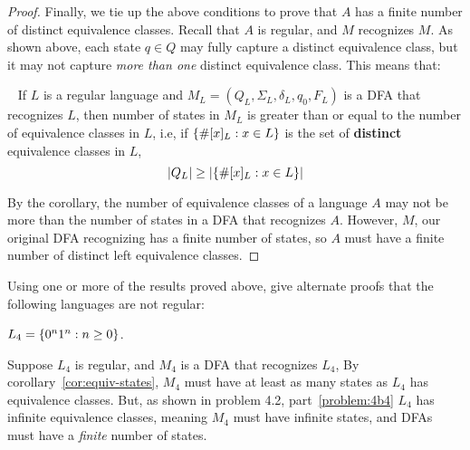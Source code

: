 \begin{problem}
\begin{enumalph}
\begin{Answer}
\begin{claim}
\begin{proof}
            \step
            Finally, we tie up the above conditions to prove that $A$ has a finite number of
            distinct equivalence classes. Recall that $A$ is regular, and $M$ recognizes $M$.
            As shown above, each state $q \in Q$ may fully capture a distinct equivalence class,
            but it may not capture \emph{more than one} distinct equivalence class.
            This means that:
            
            \begin{corollary}~\label{cor:equiv-states}
              If $L$ is a regular language and $M_L = (Q_L, \Sigma_L, \delta_L, q_0, F_L)$
              is a DFA that recognizes $L$, then number of states in $M_L$
              is greater than or equal to the number of equivalence classes in $L$, i.e,
              if $\left\{\#[x]_L : x \in L\right\}$ is the set of \textbf{distinct} equivalence classes in $L$,
              \[ \lvert Q_L\rvert \ge \lvert\left\{\#[x]_L : x \in L\right\}\rvert \]
            \end{corollary}
            
            \step
            By the corollary, the number of equivalence classes of a language $A$ may not be more than
            the number of states in a DFA that recognizes $A$.
            However, $M$, our original DFA recognizing  has a finite number of states, so $A$ must have a finite number of
            distinct left equivalence classes.
          \end{proof}
        \end{claim}
      \end{Answer}
    
    \item Using one or more of the results proved above, give alternate
      proofs that the following languages are not regular:
      \begin{enumroman}
        \item $L_4 = \left\{0^n1^n : n \ge 0\right\}$.
          \begin{Answer}
            \step
            Suppose $L_4$ is regular, and $M_4$ is a DFA that recognizes $L_4$,
            By corollary~\ref{cor:equiv-states}, $M_4$ must have
            at least as many states as $L_4$ has equivalence classes.
            But, as shown in problem 4.2, part~\ref{problem:4b4}
            $L_4$ has infinite equivalence classes,
            meaning $M_4$ must have infinite states,
            and DFAs must have a \emph{finite} number of states.
            

\end{Answer}
\end{enumroman}
\end{enumalph}
\end{problem}
